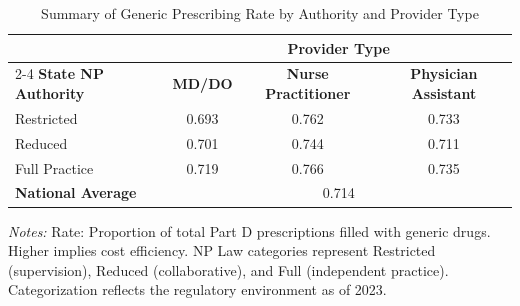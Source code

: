 \begin{table}[htbp]
    \centering
    \caption{Summary of Generic Prescribing Rate by Authority and Provider Type}
    \label{tab:partd_generic_rate_provtype}
    \vspace{0.2cm}
    \begin{tabular}{lccc}
        \toprule
        & \multicolumn{3}{c}{\textbf{Provider Type}} \\
        \cmidrule(lr){2-4}
        \textbf{State NP Authority} & \textbf{MD/DO} & \textbf{Nurse Practitioner} & \textbf{Physician Assistant} \\
        \midrule
        Restricted & 0.693 & 0.762 & 0.733 \\
        Reduced & 0.701 & 0.744 & 0.711 \\
        Full Practice & 0.719 & 0.766 & 0.735 \\
        \midrule
        \textbf{National Average} & \multicolumn{3}{c}{0.714} \\
        \bottomrule
    \end{tabular}
    \vspace{0.1cm}
    \begin{minipage}{0.85\textwidth}
        \footnotesize \textit{Notes:} Rate: Proportion of total Part D prescriptions filled with generic drugs. Higher implies cost efficiency. NP Law categories represent Restricted (supervision), Reduced (collaborative), and Full (independent practice). Categorization reflects the regulatory environment as of 2023.
    \end{minipage}
\end{table}
